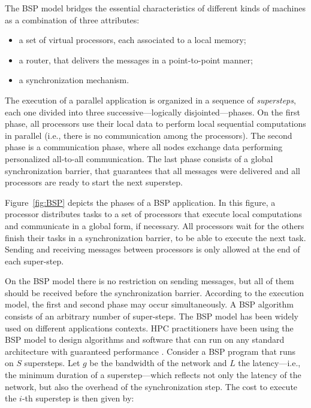 The BSP model bridges the essential characteristics of different kinds of machines as a combination of three attributes:

\begin{itemize}
\item a set of virtual processors, each associated to a local memory;
\item a router, that delivers the messages in a point-to-point manner;
\item a synchronization mechanism.
\end{itemize}

The execution of a parallel application is organized in a sequence of \emph{supersteps}, each one divided into three successive---logically disjointed---phases.
On the first phase, all processors use their local data to perform local sequential computations in parallel (i.e., there is no communication among the processors). The second phase is a communication phase, where all nodes exchange data performing personalized all-to-all communication. The last phase consists of a global synchronization barrier, that guarantees that all messages were delivered and all processors are ready to start the next superstep. 

Figure~\ref{fig:BSP} depicts the phases of a BSP application. In this figure, a processor distributes tasks to a set of processors that execute local computations and communicate in a global form, if necessary. All processors wait for the others finish their tasks in a synchronization barrier, to be able to execute the next task. Sending and receiving messages between processors is only allowed at the end of each super-step.

On the BSP model there is no restriction on sending messages, but all of them should be received before the synchronization barrier. According to the execution model, the first and second phase may occur simultaneously. A BSP algorithm consists of an arbitrary number of super-steps. The BSP model has been widely used on different applications contexts. HPC practitioners have been using the BSP model to design algorithms and software that can run on any standard architecture with guaranteed performance \cite{AlgGPU,Goldberg2004,CamargoGKG06}. Consider a BSP program that runs on $S$ supersteps. Let $g$ be the bandwidth of the network and $L$ the latency---i.e., the minimum duration of a superstep---which reflects not only the latency of the network, but also the overhead of the synchronization step. The cost to execute the $i$-th superstep is then given by:

